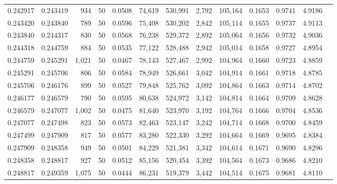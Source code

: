 \begin{tabular}{rrrrrrrrrrrrr}
0.242917 & 0.243419 &   934 &  50 &                                     0.0508 &  74,619 & 530,991 &   2,792 & 105,164 & 0.1653 & 0.9741 & 4.9186 \\
0.243420 & 0.243840 &   789 &  50 &                                     0.0596 &  75,408 & 530,202 &   2,842 & 105,114 & 0.1655 & 0.9737 & 4.9113 \\
0.243840 & 0.244317 &   830 &  50 &                                     0.0568 &  76,238 & 529,372 &   2,892 & 105,064 & 0.1656 & 0.9732 & 4.9036 \\
0.244318 & 0.244759 &   884 &  50 &                                     0.0535 &  77,122 & 528,488 &   2,942 & 105,014 & 0.1658 & 0.9727 & 4.8954 \\
0.244759 & 0.245291 & 1,021 &  50 &                                     0.0467 &  78,143 & 527,467 &   2,992 & 104,964 & 0.1660 & 0.9723 & 4.8859 \\
0.245291 & 0.245706 &   806 &  50 &                                     0.0584 &  78,949 & 526,661 &   3,042 & 104,914 & 0.1661 & 0.9718 & 4.8785 \\
0.245706 & 0.246176 &   899 &  50 &                                     0.0527 &  79,848 & 525,762 &   3,092 & 104,864 & 0.1663 & 0.9714 & 4.8702 \\
0.246177 & 0.246579 &   790 &  50 &                                     0.0595 &  80,638 & 524,972 &   3,142 & 104,814 & 0.1664 & 0.9709 & 4.8628 \\
0.246579 & 0.247077 & 1,002 &  50 &                                     0.0475 &  81,640 & 523,970 &   3,192 & 104,764 & 0.1666 & 0.9704 & 4.8536 \\
0.247077 & 0.247498 &   823 &  50 &                                     0.0573 &  82,463 & 523,147 &   3,242 & 104,714 & 0.1668 & 0.9700 & 4.8459 \\
0.247499 & 0.247909 &   817 &  50 &                                     0.0577 &  83,280 & 522,330 &   3,292 & 104,664 & 0.1669 & 0.9695 & 4.8384 \\
0.247909 & 0.248358 &   949 &  50 &                                     0.0501 &  84,229 & 521,381 &   3,342 & 104,614 & 0.1671 & 0.9690 & 4.8296 \\
0.248358 & 0.248817 &   927 &  50 &                                     0.0512 &  85,156 & 520,454 &   3,392 & 104,564 & 0.1673 & 0.9686 & 4.8210 \\
0.248817 & 0.249359 & 1,075 &  50 &                                     0.0444 &  86,231 & 519,379 &   3,442 & 104,514 & 0.1675 & 0.9681 & 4.8110 \\

\end{tabular}
